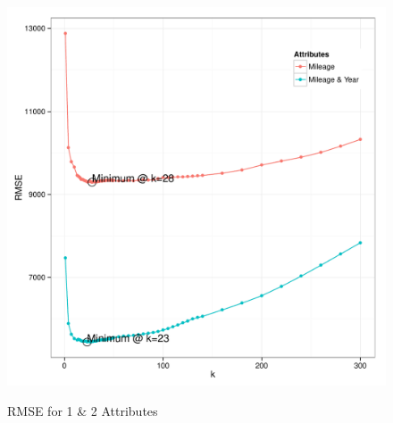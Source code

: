 \documentclass[11pt, fleqn]{article}
\begin{document}
\begin{figure}[!htb]
  \centering
  \caption{RMSE for 1 \& 2 Attributes}
  \includegraphics[scale=.5]{1p_2p_cv_compare.pdf}
  \label{fig:p_compare}
\end{figure}
\end{document}
